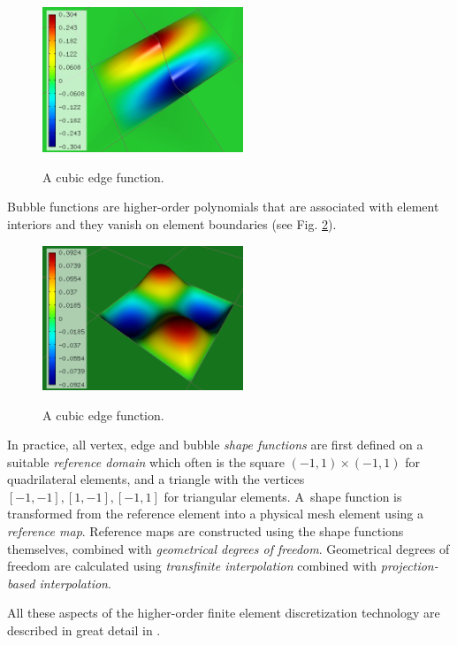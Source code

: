 \documentclass[final,3p,times,twocolumn]{elsarticle}
\begin{document}
\begin{figure}[!htb]
\begin{center}
 {
\includegraphics[width=6cm]{fn_edge.png}
}
\end{center}
\caption{A cubic edge function.}
\label{fig:edge-fn}
\end{figure}

Bubble functions are higher-order polynomials
that are associated with element interiors and 
they vanish on element boundaries (see Fig. 
\ref{fig:bubble-fn}).

\begin{figure}[!htb]
\begin{center}
 {
\includegraphics[width=6cm]{fn_bubble.png}
}
\end{center}
\caption{A cubic edge function.}
\label{fig:bubble-fn}
\end{figure}

In practice, all vertex, edge and bubble
{\em shape functions} are first defined on 
a suitable {\em reference domain} which often is 
the square $(-1, 1)\times (-1,1)$ for 
quadrilateral elements, and a triangle
with the vertices $[-1, -1], [1, -1], [-1,1]$
for triangular elements. A~shape function 
is transformed from the reference element 
into a physical mesh element using a {\em reference
map}. Reference maps are constructed using 
the shape functions themselves, combined with 
{\em geometrical degrees of freedom}. Geometrical
degrees of freedom are calculated using
{\em transfinite interpolation} combined
with {\em projection-based interpolation}.

All these aspects of the higher-order finite element 
discretization technology are described in great 
detail in \cite{sosedo}.
\end{document}

